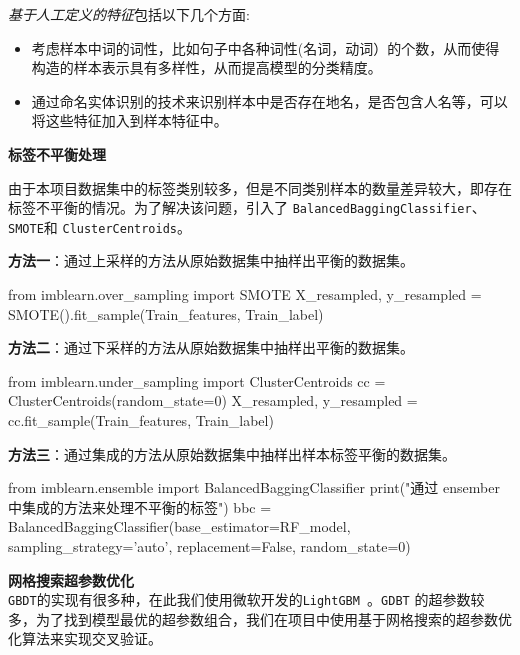 \noindent \textit{基于人工定义的特征}包括以下几个方面:

\begin{itemize}
    \item 考虑样本中词的词性，比如句子中各种词性(名词，动词）的个数，从而使得构造的样本表示具有多样性，从而提高模型的分类精度。
    \item 通过命名实体识别的技术来识别样本中是否存在地名，是否包含人名等，可以将这些特征加入到样本特征中。
\end{itemize}


\noindent \textbf{标签不平衡处理}

\noindent 由于本项目数据集中的标签类别较多，但是不同类别样本的数量差异较大，即存在标签不平衡的情况。为了解决该问题，引入了 \texttt{BalancedBaggingClassifier}、\texttt{SMOTE}和 \texttt{ClusterCentroids}。

\noindent \textbf{方法一}：通过上采样的方法从原始数据集中抽样出平衡的数据集。

\begin{python}
from imblearn.over_sampling import SMOTE
X_resampled, y_resampled = SMOTE().fit_sample(Train_features, Train_label)
\end{python}

\noindent \textbf{方法二}：通过下采样的方法从原始数据集中抽样出平衡的数据集。

\begin{python}
from imblearn.under_sampling import ClusterCentroids
cc = ClusterCentroids(random_state=0)
X_resampled, y_resampled = cc.fit_sample(Train_features, Train_label)
\end{python}

\noindent \textbf{方法三}：通过集成的方法从原始数据集中抽样出样本标签平衡的数据集。


\begin{python}
from imblearn.ensemble import BalancedBaggingClassifier
print("通过 ensember 中集成的方法来处理不平衡的标签")
bbc = BalancedBaggingClassifier(base_estimator=RF_model,
                                sampling_strategy='auto',
                                replacement=False,
                                random_state=0)
\end{python}


\noindent \textbf{网格搜索超参数优化}\\

\noindent \texttt{GBDT}的实现有很多种，在此我们使用微软开发的\texttt{LightGBM~\cite{ke2017lightgbm}}。\texttt{GDBT} 的超参数较多，为了找到模型最优的超参数组合，我们在项目中使用基于网格搜索的超参数优化算法来实现交叉验证。\\

